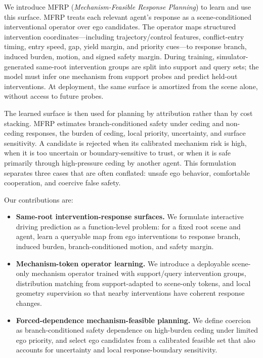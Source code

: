 \documentclass[10pt]{article}
\newcommand{\framework}{MFRP}
\begin{document}
We introduce \framework{} (\emph{Mechanism-Feasible Response Planning}) to learn and use this surface. \framework{} treats each relevant agent's response as a scene-conditioned interventional operator over ego candidates. The operator maps structured intervention coordinates---including trajectory/control features, conflict-entry timing, entry speed, gap, yield margin, and priority cues---to response branch, induced burden, motion, and signed safety margin. During training, simulator-generated same-root intervention groups are split into support and query sets; the model must infer one mechanism from support probes and predict held-out interventions. At deployment, the same surface is amortized from the scene alone, without access to future probes.

The learned surface is then used for planning by attribution rather than by cost stacking. \framework{} estimates branch-conditioned safety under ceding and non-ceding responses, the burden of ceding, local priority, uncertainty, and surface sensitivity. A candidate is rejected when its calibrated mechanism risk is high, when it is too uncertain or boundary-sensitive to trust, or when it is safe primarily through high-pressure ceding by another agent. This formulation separates three cases that are often conflated: unsafe ego behavior, comfortable cooperation, and coercive false safety.

Our contributions are:
\begin{itemize}[leftmargin=*]
    \item \textbf{Same-root intervention-response surfaces.} We formulate interactive driving prediction as a function-level problem: for a fixed root scene and agent, learn a queryable map from ego interventions to response branch, induced burden, branch-conditioned motion, and safety margin.
    \item \textbf{Mechanism-token operator learning.} We introduce a deployable scene-only mechanism operator trained with support/query intervention groups, distribution matching from support-adapted to scene-only tokens, and local geometry supervision so that nearby interventions have coherent response changes.
    \item \textbf{Forced-dependence mechanism-feasible planning.} We define coercion as branch-conditioned safety dependence on high-burden ceding under limited ego priority, and select ego candidates from a calibrated feasible set that also accounts for uncertainty and local response-boundary sensitivity.
\end{itemize}
\end{document}
